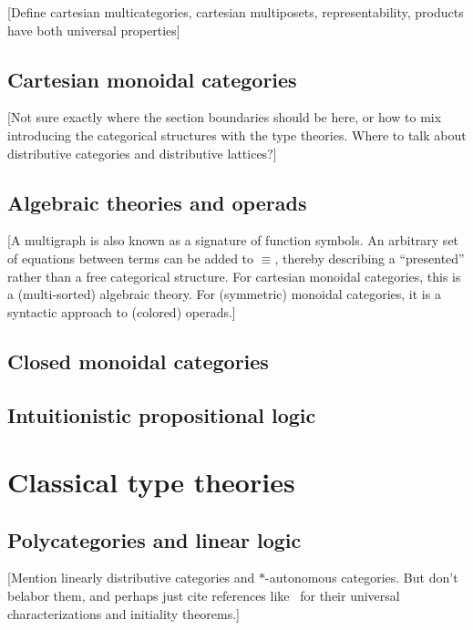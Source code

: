\documentclass{book}
\begin{document}
[Define cartesian multicategories, cartesian multiposets, representability, products have both universal properties]


\section{Cartesian monoidal categories}
\label{sec:cartmoncat}

[Not sure exactly where the section boundaries should be here, or how to mix introducing the categorical structures with the type theories.
Where to talk about distributive categories and distributive lattices?]


\section{Algebraic theories and operads}
\label{sec:algthy-opd}

[A multigraph is also known as a signature of function symbols.  An arbitrary set of equations between terms can be added to $\equiv$, thereby describing a ``presented'' rather than a free categorical structure.  For cartesian monoidal categories, this is a (multi-sorted) algebraic theory.  For (symmetric) monoidal categories, it is a syntactic approach to (colored) operads.]


\section{Closed monoidal categories}
\label{sec:clmoncat}


\section{Intuitionistic propositional logic}
\label{sec:int-logic}


\chapter{Classical type theories}
\label{chap:polycats}



\section{Polycategories and linear logic}
\label{sec:cllin}

[Mention linearly distributive categories and $\ast$-autonomous categories.
But don't belabor them, and perhaps just cite references like~\cite{cs:wkdistrib} for their universal characterizations and initiality theorems.]
\end{document}

